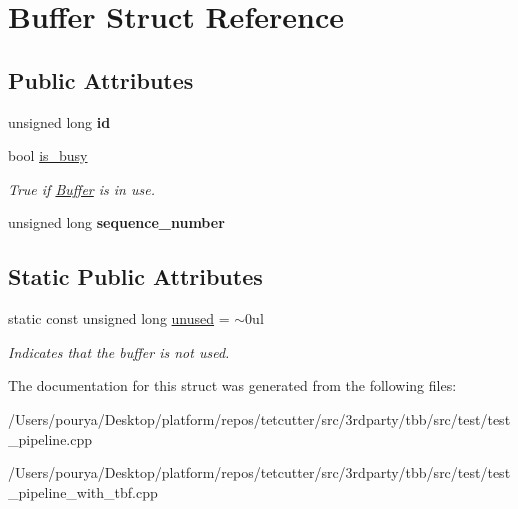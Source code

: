 \hypertarget{structBuffer}{}\section{Buffer Struct Reference}
\label{structBuffer}
\subsection*{Public Attributes}
\begin{DoxyCompactItemize}
\item 
\hypertarget{structBuffer_a674ce0bbf200081c0429c2d9bc7d667e}{}unsigned long {\bfseries id}\label{structBuffer_a674ce0bbf200081c0429c2d9bc7d667e}

\item 
\hypertarget{structBuffer_a56bd4fbb2fc948265307e56684aa09d8}{}bool \hyperlink{structBuffer_a56bd4fbb2fc948265307e56684aa09d8}{is\+\_\+busy}\label{structBuffer_a56bd4fbb2fc948265307e56684aa09d8}

\begin{DoxyCompactList}\small\item\em True if \hyperlink{structBuffer}{Buffer} is in use. \end{DoxyCompactList}\item 
\hypertarget{structBuffer_aabe34281ef7094be6e91f76dd283e350}{}unsigned long {\bfseries sequence\+\_\+number}\label{structBuffer_aabe34281ef7094be6e91f76dd283e350}

\end{DoxyCompactItemize}
\subsection*{Static Public Attributes}
\begin{DoxyCompactItemize}
\item 
\hypertarget{structBuffer_ae01a3bda1d387b1b1a4fc0ad876dbfe3}{}static const unsigned long \hyperlink{structBuffer_ae01a3bda1d387b1b1a4fc0ad876dbfe3}{unused} = $\sim$0ul\label{structBuffer_ae01a3bda1d387b1b1a4fc0ad876dbfe3}

\begin{DoxyCompactList}\small\item\em Indicates that the buffer is not used. \end{DoxyCompactList}\end{DoxyCompactItemize}


The documentation for this struct was generated from the following files\+:\begin{DoxyCompactItemize}
\item 
/\+Users/pourya/\+Desktop/platform/repos/tetcutter/src/3rdparty/tbb/src/test/test\+\_\+pipeline.\+cpp\item 
/\+Users/pourya/\+Desktop/platform/repos/tetcutter/src/3rdparty/tbb/src/test/test\+\_\+pipeline\+\_\+with\+\_\+tbf.\+cpp\end{DoxyCompactItemize}
